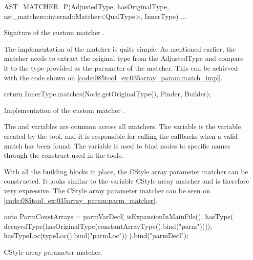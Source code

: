 \begin{listing}[H]
    \begin{cppcode}
AST_MATCHER_P(AdjustedType, hasOriginalType, ast_matchers::internal::Matcher<QualType>, InnerType) {
    ...
}
    \end{cppcode}
    \caption{Signiture of the custom matcher .}
    \label{code:085tool_ex:035array_param:match_signiture}
\end{listing}

The implementation of the matcher is quite simple. As mentioned earlier, the matcher needs to extract the original type from the AdjustedType and compare it to the type provided as the parameter of the matcher. This can be achieved with the code shown on \cref{code:085tool_ex:035array_param:match_impl}.

\begin{listing}[H]
    \begin{cppcode}
return InnerType.matches(Node.getOriginalType(), Finder, Builder);
    \end{cppcode}
    \caption{Implementation of the custom matcher .}
    \label{code:085tool_ex:035array_param:match_impl}
\end{listing}

The  and  variables are common across all matchers. The  variable is the  variable created by the tool, and it is responsible for calling the callbacks when a valid match has been found. The  variable is used to bind nodes to specific names through the  construct used in the tools.

With all the building blocks in place, the CStyle array parameter matcher can be constructed. It looks similar to the variable CStyle array matcher and is therefore very expressive. The CStyle array parameter matcher can be seen on \cref{code:085tool_ex:035array_param:parm_matcher}.

\begin{listing}[H]
    \begin{cppcode}
auto ParmConstArrays = parmVarDecl(
        isExpansionInMainFile(),
        hasType(
            decayedType(hasOriginalType(constantArrayType().bind("parm")))),
        hasTypeLoc(typeLoc().bind("parmLoc")) 
    ).bind("parmDecl");
    \end{cppcode}
    \caption{CStyle array parameter matcher.}
    \label{code:085tool_ex:035array_param:parm_matcher}
\end{listing}

